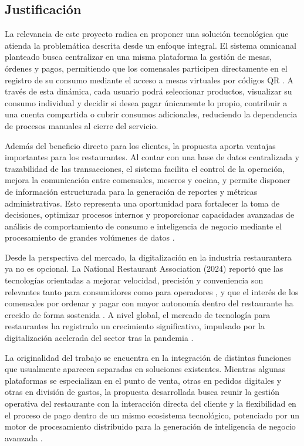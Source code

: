 \subsection{Justificación}

La relevancia de este proyecto radica en proponer una soluci\'on tecnol\'ogica que atienda
la problem\'atica descrita desde un enfoque integral. El sistema omnicanal planteado busca
centralizar en una misma plataforma la gesti\'on de mesas, \'ordenes y pagos, permitiendo que
los comensales participen directamente en el registro de su consumo mediante el acceso a mesas
virtuales por c\'odigos QR \cite{koay_qr_2024, toast_contactless_2026}. A trav\'es de esta din\'amica, cada usuario podr\'a seleccionar
productos, visualizar su consumo individual y decidir si desea pagar \'unicamente lo propio,
contribuir a una cuenta compartida o cubrir consumos adicionales, reduciendo la dependencia
de procesos manuales al cierre del servicio.

Adem\'as del beneficio directo para los clientes, la propuesta aporta ventajas importantes
para los restaurantes. Al contar con una base de datos centralizada y trazabilidad de las
transacciones, el sistema facilita el control de la operaci\'on, mejora la comunicaci\'on entre
comensales, meseros y cocina, y permite disponer de informaci\'on estructurada para la generaci\'on
de reportes y m\'etricas administrativas. Esto representa una oportunidad para fortalecer la
toma de decisiones, optimizar procesos internos y proporcionar capacidades avanzadas
de an\'alisis de comportamiento de consumo e inteligencia de negocio mediante el
procesamiento de grandes vol\'umenes de datos \cite{choo_qr_2023}.

Desde la perspectiva del mercado, la digitalizaci\'on en la industria restaurantera ya no es
opcional. La National Restaurant Association (2024) report\'o que las tecnolog\'ias orientadas
a mejorar velocidad, precisi\'on y conveniencia son relevantes tanto para consumidores como para
operadores \cite{nra_state_2023}, y que el inter\'es de los comensales por ordenar y pagar con mayor autonom\'ia
dentro del restaurante ha crecido de forma sostenida \cite{gonzalez_canirac_2024}.
A nivel global, el mercado de tecnolog\'ia para restaurantes ha registrado un crecimiento
significativo, impulsado por la digitalizaci\'on acelerada del sector tras la pandemia \cite{gonzalez_canirac_2024, nra_state_2023}.

La originalidad del trabajo se encuentra en la integraci\'on de distintas funciones que
usualmente aparecen separadas en soluciones existentes. Mientras algunas plataformas se
especializan en el punto de venta, otras en pedidos digitales y otras en divisi\'on de gastos,
la propuesta desarrollada busca reunir la gesti\'on operativa del restaurante con la interacci\'on
directa del cliente y la flexibilidad en el proceso de pago dentro de un mismo ecosistema
tecnol\'ogico, potenciado por un motor de procesamiento distribuido para la
generaci\'on de inteligencia de negocio avanzada \cite{iovescu_realtime_2024}.

